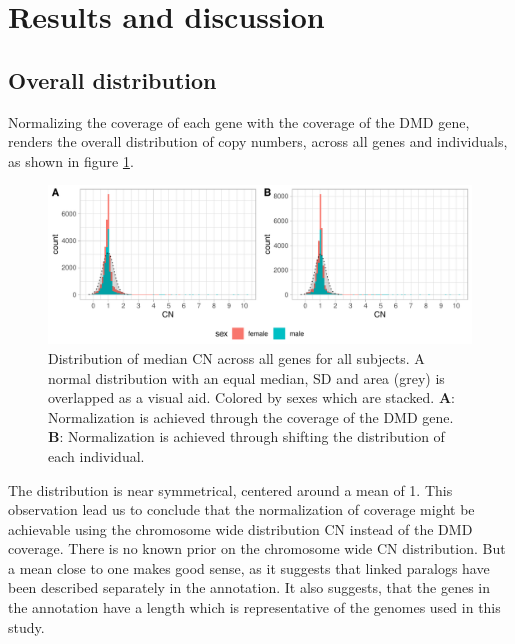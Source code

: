 
\section*{Results and discussion} %


\subsection*{Overall distribution}
Normalizing the coverage of each gene with the coverage of the DMD gene, renders the overall distribution of copy numbers, across all genes and individuals, as shown in figure \ref{fig:qc_dist_all}. 

\begin{figure}[h] 
  \centering
  \includegraphics[scale=0.78]{figures/fig_overall_1and3.pdf}
  
  \caption{Distribution of median CN across all genes for all subjects. A normal distribution with an equal median, SD and area (grey) is overlapped as a visual aid. Colored by sexes which are stacked. \textbf{A}: Normalization is achieved through the coverage of the DMD gene. \textbf{B}: Normalization is achieved through shifting the distribution of each individual.}
  
  \label{fig:qc_dist_all}
\end{figure}

\noindent The distribution is near symmetrical, centered around a mean of 1. This observation lead us to conclude that the normalization of coverage might be achievable using the chromosome wide distribution CN instead of the DMD coverage. There is no known prior on the chromosome wide CN distribution. But a mean close to one makes good sense, as it suggests that linked paralogs have been described separately in the annotation. It also suggests, that the genes in the annotation have a length which is representative of the genomes used in this study.

